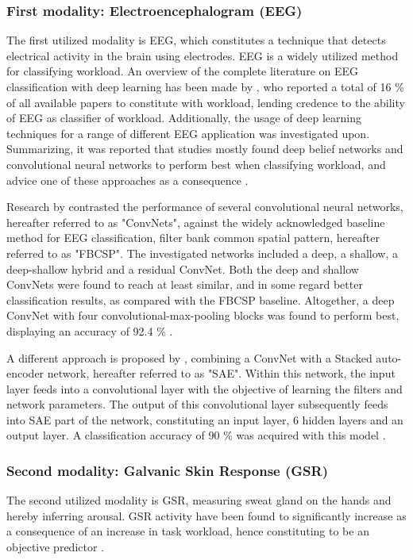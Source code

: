 \documentclass[12pt]{article}
\begin{document}
\subsubsection{First modality: Electroencephalogram (EEG)}
The first utilized modality is EEG, which constitutes a technique that detects electrical activity in the brain using electrodes. EEG is a widely utilized method for classifying workload. An overview of the complete literature on EEG classification with deep learning has been made by , who reported a total of 16 \% of all available papers to constitute with workload, lending credence to the ability of EEG as classifier of workload. Additionally, the usage of deep learning techniques for a range of different EEG application was investigated upon. Summarizing, it was reported that studies mostly found deep belief networks and convolutional neural networks to perform best when classifying workload, and advice one of these approaches as a consequence \cite{craik2019deep}.

Research by  contrasted the performance of several convolutional neural networks, hereafter referred to as "ConvNets", against the widely acknowledged baseline method for EEG classification, filter bank common spatial pattern, hereafter referred to as "FBCSP". The investigated networks included a deep, a shallow, a deep-shallow hybrid and a residual ConvNet. Both the deep and shallow ConvNets were found to reach at least similar, and in some regard better classification results, as compared with the FBCSP baseline. Altogether, a deep ConvNet with four convolutional-max-pooling blocks was found to perform best, displaying an accuracy of 92.4 \% \cite{schirrmeister2017deep}.

A different approach is proposed by , combining a ConvNet with a Stacked auto-encoder network, hereafter referred to as "SAE". Within this network, the input layer feeds into a convolutional layer with the objective of learning the filters and network parameters. The output of this convolutional layer subsequently feeds into SAE part of the network, constituting an input layer, 6 hidden layers and an output layer. A classification accuracy of 90 \% was acquired with this model \cite{tabar2016novel} . 

\subsubsection{Second modality: Galvanic Skin Response (GSR)}
The second utilized modality is GSR, measuring sweat gland on the hands and hereby inferring arousal. GSR activity have been found to significantly increase as a consequence of an increase in task workload, hence constituting to be an objective predictor \cite{shi2007galvanic}. 
\end{document}
